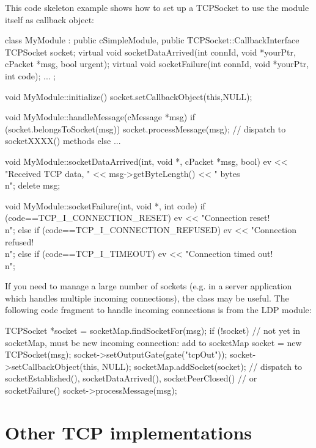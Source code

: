 This code skeleton example shows how to set up a TCPSocket to use the module
itself as callback object:

\begin{cpp}
class MyModule : public cSimpleModule, public TCPSocket::CallbackInterface
{
    TCPSocket socket;
    virtual void socketDataArrived(int connId, void *yourPtr,
                                   cPacket *msg, bool urgent);
    virtual void socketFailure(int connId, void *yourPtr, int code);
    ...
};

void MyModule::initialize() {
    socket.setCallbackObject(this,NULL);
}

void MyModule::handleMessage(cMessage *msg) {
    if (socket.belongsToSocket(msg))
        socket.processMessage(msg); // dispatch to socketXXXX() methods
    else
        ...
}

void MyModule::socketDataArrived(int, void *, cPacket *msg, bool) {
    ev << "Received TCP data, " << msg->getByteLength() << " bytes\\n";
    delete msg;
}

void MyModule::socketFailure(int, void *, int code) {
    if (code==TCP_I_CONNECTION_RESET)
        ev << "Connection reset!\\n";
    else if (code==TCP_I_CONNECTION_REFUSED)
        ev << "Connection refused!\\n";
    else if (code==TCP_I_TIMEOUT)
        ev << "Connection timed out!\\n";
}
\end{cpp}

If you need to manage a large number of sockets (e.g. in a server
application which handles multiple incoming connections), the
 class may be useful. The following code
fragment to handle incoming connections is from the LDP module:

\begin{cpp}
TCPSocket *socket = socketMap.findSocketFor(msg);
if (!socket)
{
    // not yet in socketMap, must be new incoming connection: add to socketMap
    socket = new TCPSocket(msg);
    socket->setOutputGate(gate("tcpOut"));
    socket->setCallbackObject(this, NULL);
    socketMap.addSocket(socket);
}
// dispatch to socketEstablished(), socketDataArrived(), socketPeerClosed()
// or socketFailure()
socket->processMessage(msg);
\end{cpp}


\section{Other TCP implementations}
\label{sec:other_tcp}

